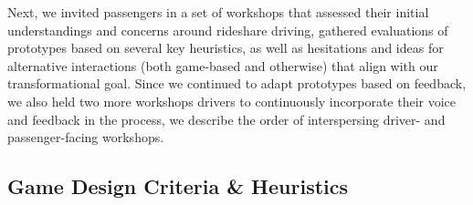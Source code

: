 Next, we invited passengers in a set of workshops that assessed their initial understandings and concerns around rideshare driving, gathered evaluations of prototypes based on several key heuristics, as well as hesitations and ideas for alternative interactions (both game-based and otherwise) that align with our transformational goal. Since we continued to adapt prototypes based on feedback, we also held two more workshops drivers to continuously incorporate their voice and feedback in the process, we describe the order of interspersing driver- and passenger-facing workshops.




\subsection{Game Design Criteria \& Heuristics} \label{technique}


